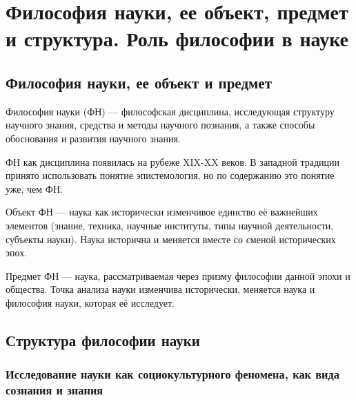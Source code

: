 \section{Философия науки, ее объект, предмет и структура. Роль философии в науке }   

\subsection{Философия науки, ее объект и предмет}





Философия науки (ФН) --- философская дисциплина, исследующая структуру научного знания, средства и методы научного познания, а также способы обоснования и развития научного знания.

ФН как дисциплина появилась на рубеже XIX-XX веков. В западной традиции принято 
использовать понятие эпистемология, но по содержанию это понятие уже, чем ФН.

Объект ФН --- наука как исторически изменчивое единство её важнейших элементов (знание, техника,  научные институты, типы научной деятельности, субъекты науки). Наука исторична и меняется вместе со сменой исторических эпох.
 
Предмет ФН --- наука, рассматриваемая через призму философии данной эпохи и общества. Точка анализа науки изменчива исторически, меняется наука и философия науки, которая её исследует.

\subsection{Структура философии науки}

\subsubsection{Исследование науки как социокультурного феномена, как вида сознания и знания}

